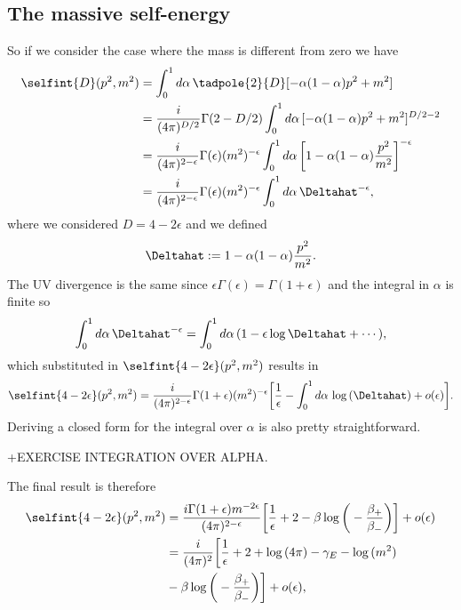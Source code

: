 \subsection{The massive self-energy}
So if we consider the case where the mass is different from zero we have
\begin{equation}
    \begin{split}
        \selfint{D}(p^2,m^2) &= \int_0^1 d\alpha\,\tadpole{2}{D}[-\alpha(1-\alpha)p^2 + m^2] \\
        &= \frac{i}{(4\pi)^{D/2}}\Gamma(2 - D/2)\int_0^1 d\alpha\,[-\alpha(1-\alpha)p^2 + m^2]^{D/2 - 2} \\
        &= \frac{i}{(4\pi)^{2 - \epsilon}}\Gamma(\epsilon)(m^2)^{-\epsilon}\int_0^1 d\alpha\,\bigg[1 - \alpha(1-\alpha)\frac{p^2}{m^2}\bigg]^{-\epsilon} \\
        &= \frac{i}{(4\pi)^{2 - \epsilon}}\Gamma(\epsilon)(m^2)^{-\epsilon}\int_0^1 d\alpha\,\Deltahat^{-\epsilon},
    \end{split}
\end{equation}
where we considered $D = 4 - 2\epsilon$ and we defined 
\begin{equation}
    \Deltahat := 1 - \alpha(1-\alpha)\frac{p^2}{m^2}.
\end{equation}
The UV divergence is the same since $\epsilon\Gamma(\epsilon) = \Gamma(1 + \epsilon)$ and the integral in $\alpha$ is finite so 
\begin{equation}
    \int_0^1 d\alpha\,\Deltahat^{-\epsilon} = \int_0^1 d\alpha\,(1 -\epsilon\log{\Deltahat} + \cdots),
\end{equation}
which substituted in $\selfint{4 - 2\epsilon}(p^2,m^2)$ results in
\begin{equation}
    \selfint{4 - 2\epsilon}(p^2,m^2) = \frac{i}{(4\pi)^{2 - \epsilon}}\Gamma(1 + \epsilon)(m^2)^{-\epsilon}\bigg[\frac{1}{\epsilon} - \int_0^1 d\alpha\,\log{(\Deltahat)} + o(\epsilon)\bigg].
\end{equation}
Deriving a closed form for the integral over $\alpha$ is also pretty straightforward.
\begin{ex}
    +EXERCISE INTEGRATION OVER ALPHA.
\end{ex}
The final result is therefore
\begin{equation}
\label{eq: massive self-energy integral}
    \begin{split}
        \selfint{4 - 2\epsilon}(p^2,m^2) &= \frac{i\Gamma(1+\epsilon)m^{-2\epsilon}}{(4\pi)^{2-\epsilon}}\bigg[\frac{1}{\epsilon} + 2 -\beta\log{\bigg(-\frac{\beta_+}{\beta_-}\bigg)}\bigg] + o(\epsilon) \\
        &= \frac{i}{(4\pi)^2}\bigg[\frac{1}{\epsilon} + 2 + \log{(4\pi)} - \gamma_E - \log{(m^2)} \\
        &-\beta\log{\bigg(-\frac{\beta_+}{\beta_-}\bigg)}\bigg] + o(\epsilon),
    \end{split} 
\end{equation}
